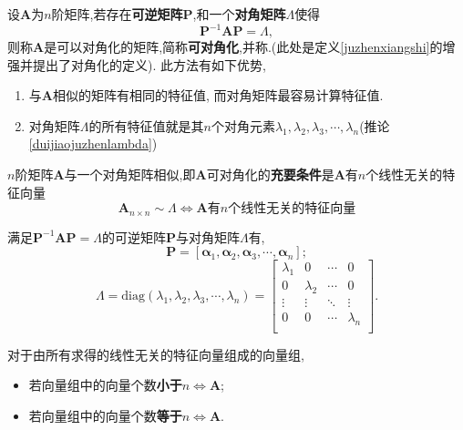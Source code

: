 \documentclass[9pt,a4paper]{book}
\begin{document}
\begin{defination}[矩阵对角化的定义]
	设$ \bm{A} $为$ n $阶矩阵,若存在\textbf{可逆矩阵}$ \bm{P} $,和一个\textbf{对角矩阵}$ \bm{\varLambda} $使得
	\[
	\bm{P}^{-1}\bm{A}\bm{P}=\bm{\varLambda},
	\]
	则称$ \bm{A}$是可以对角化的矩阵,简称\textbf{可对角化},并称.(此处是定义\ref{juzhenxiangshi}的增强并提出了对角化的定义).
	此方法有如下优势,
	\begin{enumerate}
		\item 与$ \bm{A}$相似的矩阵有相同的特征值,
		而对角矩阵最容易计算特征值.
		\item 对角矩阵$ \bm{\varLambda}$的所有特征值就是其$ n $个对角元素$\lambda_1,\lambda_2,\lambda_3,\cdots,\lambda_n $(推论\ref{duijiaojuzhenlambda})
	\end{enumerate}
\end{defination}
\begin{theorem}[可对角化判据第一充分必要条件]
	$ n $阶矩阵$ \bm{A}$与一个对角矩阵相似,即$ \bm{A}$可对角化的\textbf{充要条件}是$ \bm{A}$有$ n $个线性无关的特征向量
	\[
	\bm{A}_{n\times n}\sim \bm{\varLambda}
	\Leftrightarrow
	\bm{A}
	\mbox{有}n
	\mbox{个线性无关的特征向量}
	\]
\end{theorem}
\begin{inference}\label{duijiaojuzhenlambda}
	满足$ \bm{P}^{-1}\bm{A}\bm{P}=\bm{\varLambda} $的可逆矩阵$ \bm{P} $与对角矩阵$ \bm{\varLambda} $有,
	\[\bm{P}=[\bm{\alpha}_{1},\bm{\alpha}_{2},\bm{\alpha}_{3},\cdots,\bm{\alpha}_{n}];\]
	\[\bm{\varLambda}=\mathrm{diag}(\lambda_1,\lambda_2,\lambda_3,\cdots,\lambda_n)=
	\begin{bmatrix}
	\lambda_1&0         &\cdots &0 \\
	0        & \lambda_2&\cdots &0\\
	\vdots   & \vdots   & \ddots&\vdots \\
	0        & 0        &\cdots & \lambda_n\\
	\end{bmatrix}.\]
\end{inference}
\begin{theorem}[可对角化判据第二充分必要条件]
	对于由所有求得的线性无关的特征向量组成的向量组,\\
\begin{itemize}
\item 若向量组中的向量个数\textbf{小于}$ n $$ \Leftrightarrow $$ \bm{A}$;
\item 若向量组中的向量个数\textbf{等于}$ n $$ \Leftrightarrow $$ \bm{A}$.
\end{itemize}
\end{theorem}
\end{document}
